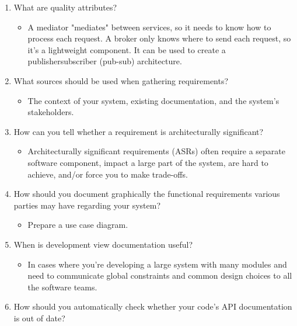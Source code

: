 \begin{enumerate}
\item
What are quality attributes?

\begin{itemize}
\item 
A mediator "mediates" between services, so it needs to know how to process each request. A broker only knows where to send each request, so it's a lightweight component. It can be used to create a publishersubscriber (pub-sub) architecture.
\end{itemize}

\item
What sources should be used when gathering requirements?

\begin{itemize}
\item 
The context of your system, existing documentation, and the system's stakeholders.
\end{itemize}

\item
How can you tell whether a requirement is architecturally significant?

\begin{itemize}
\item 
Architecturally significant requirements (ASRs) often require a separate software component, impact a large part of the system, are hard to achieve, and/or force you to make trade-offs.
\end{itemize}

\item
How should you document graphically the functional requirements various parties may have regarding your system?

\begin{itemize}
\item 
Prepare a use case diagram.
\end{itemize}

\item
When is development view documentation useful?

\begin{itemize}
\item 
In cases where you're developing a large system with many modules and need to communicate global constraints and common design choices to all the software teams.
\end{itemize}

\item
How should you automatically check whether your code's API documentation is out of date?


\end{enumerate}
